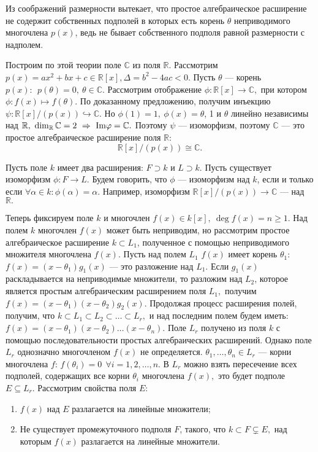 Из соображений размерности вытекает, что простое алгебраическое расширение не содержит собственных подполей в которых есть корень $\theta$ неприводимого
многочлена $p(x)$, ведь не бывает собственного подполя равной размерности с надполем.

Построим по этой теории поле $\mathbb C$ из поля $\mathbb R$. Рассмотрим $p(x)=ax^2+bx+c\in \mathbb R[x], \Delta=b^2-4ac<0.$
Пусть $\theta$ --- корень $p(x):\ \ p(\theta)=0,\ \theta\in\mathbb C.$ Рассмотрим отображение $\phi : \mathbb R[x]\rightarrow \mathbb C,$ при котором $\phi : f(x)\mapsto f(\theta).$
По доказанному предложению, получим инъекцию $\psi : \mathbb R[x]/(p(x))\hookrightarrow \mathbb C.$ Но $\phi(1)=1,\ \phi(x)=\theta$, 1 и $\theta$ линейно
независимы над $\mathbb R,\ \dim_\mathbb R\mathbb C=2\ra \rr{Im}\phi=\mathbb C.$ Поэтому $\psi$ --- изоморфизм, поэтому $\mathbb C$ --- это простое
алгебраическое расширение поля $\mathbb R:$
$$
\mathbb R[x]/(p(x))\cong\mathbb {C}.
$$

Пусть поле $k$ имеет два расширения: $F\supset k$ и $L\supset k.$
Пусть существует изоморфизм $\phi : F\rightarrow L.$ Будем
говорить, что $\phi$ --- изоморфизм над $k$, если и только если
$\forall \alpha\in k : \phi(\alpha)=\alpha.$ Например, изоморфизм
$\mathbb R[x]/(p(x))\rightarrow\mathbb {C}$ --- над $\mathbb R.$

Теперь фиксируем поле $k$ и многочлен $f(x)\in k[x],\ \deg
f(x)=n\ge 1.$ Над полем $k$ многочлен $f(x)$ может быть
неприводим, но рассмотрим простое алгебраическое расширение
$k\subset L_1$, полученное с помощью неприводимого множителя
многочлена $f(x).$ Пусть над полем $L_1$ $f(x)$ имеет корень
$\theta_1$: $f(x)=(x-\theta_1)g_1(x)$ --- это разложение над
$L_1.$ Если $g_1(x)$ раскладывается на неприводимые множители, то
разложим над $L_2$, которое является простым алгебраическим
расширением поля $L_1,$ получим
$f(x)=(x-\theta_1)(x-\theta_2)g_2(x).$ Продолжая процесс
расширения полей, получим, что $k\subset L_1\subset
L_2\subset\dots\subset L_r,$ и над последним полем будем иметь:
$f(x)=(x-\theta_1)(x-\theta_2)\dots(x-\theta_n).$ Поле $L_r$
получено из поля $k$ с помощью последовательности простых
алгебраических расширений. Однако поле $L_r$ однозначно
многочленом $f(x)$ не определяется. $\theta_1,\dots,\theta_n\in
L_r$ --- корни многочлена $f$: $f(\theta_i)=0\ \ \forall
i=1,2,\dots,n.$ В $L_r$ можно взять пересечение всех подполей,
содержащих все корни $\theta_i$ многочлена $f(x),$ это будет
подполе $E\subseteq L_r.$ Рассмотрим свойства поля $E$:
\begin{enumerate}
    \item $f(x)$ над $E$ разлагается на линейные множители;
    \item Не существует промежуточного подполя $F$, такого, что $k\subset F\subsetneq E,$ над которым $f(x)$ разлагается на линейные множители.
\end{enumerate}

